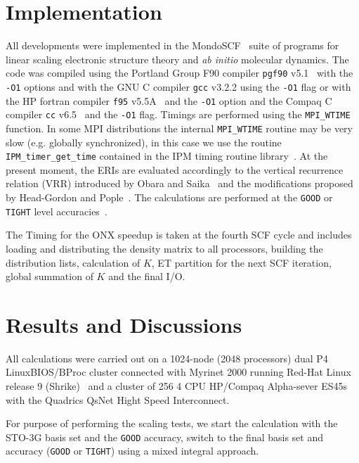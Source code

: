 \documentclass[prl,twocolumn,showpacs,twocolumngrid,superbib]{revtex4}
\begin{document}
\section{Implementation}\label{Sec:Impl}
 
 All developments were implemented in the MondoSCF~\cite{MondoSCF} suite of
 programs for linear scaling electronic structure theory and 
 {\it ab initio} molecular dynamics. 
 The code was compiled using the Portland Group F90 
 compiler {\tt pgf90} v5.1~\cite{pgf90-v5.1} with the {\tt -O1} options 
 and with the GNU C compiler {\tt gcc} v3.2.2 using the {\tt -O1} flag
 or with the HP fortran compiler {\tt f95} v5.5A~\cite{f95-v5.5a} 
 and the {\tt -O1} option and the Compaq C compiler {\tt cc} 
 v6.5~\cite{cc-v6.5} and the {\tt -O1} flag.
 Timings are performed using the {\tt MPI\_WTIME} function. 
 In some MPI distributions the internal {\tt MPI\_WTIME} 
 routine may be very slow (e.g. globally synchronized), 
 in this case we use the routine {\tt IPM\_timer\_get\_time} contained in 
 the IPM timing routine library~\cite{IPM}.
 At the present moment, the ERIs are evaluated accordingly to
 the vertical recurrence relation (VRR) introduced by Obara 
 and Saika~\cite{SObara86} and the modifications proposed by Head-Gordon
 and Pople~\cite{MGordon88}.
 The calculations are performed at the {\tt GOOD} or {\tt TIGHT} 
 level accuracies~\cite{CTymczak04b}.

 The Timing for the ONX speedup is taken at the fourth SCF cycle
 and includes loading and distributing the density matrix to all 
 processors, building the distribution lists, calculation of $K$,
 ET partition for the next SCF iteration, global summation of $K$
 and the final I/O.


\section{Results and Discussions}\label{Sec:Disc}

 All calculations were carried out on a 1024-node (2048 processors) 
 dual P4 LinuxBIOS/BProc cluster connected with Myrinet 2000 running
 Red-Hat Linux release 9 (Shrike)~\cite{RedHat90} and a cluster of 256 
 4 CPU HP/Compaq Alpha-sever ES45s with the Quadrics QsNet Hight Speed Interconnect. 

 For purpose of performing the scaling tests, we start the calculation 
 with the STO-3G basis set and the {\tt GOOD} accuracy, switch to
 the final basis set and accuracy ({\tt GOOD} or {\tt TIGHT}) using a mixed 
 integral approach. 
\end{document}

